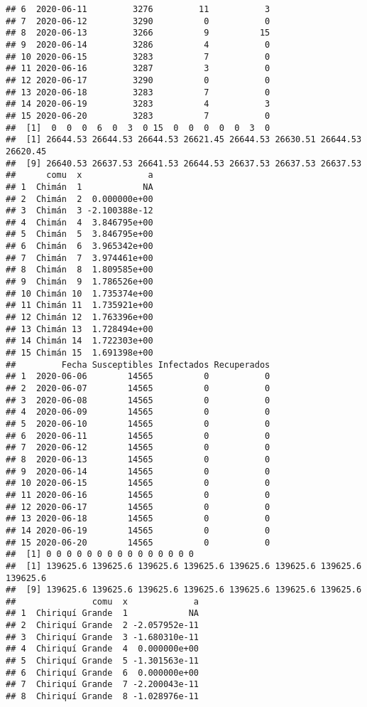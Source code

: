 \documentclass[
]{article}
\begin{document}
\begin{verbatim}
## 6  2020-06-11         3276         11           3
## 7  2020-06-12         3290          0           0
## 8  2020-06-13         3266          9          15
## 9  2020-06-14         3286          4           0
## 10 2020-06-15         3283          7           0
## 11 2020-06-16         3287          3           0
## 12 2020-06-17         3290          0           0
## 13 2020-06-18         3283          7           0
## 14 2020-06-19         3283          4           3
## 15 2020-06-20         3283          7           0
##  [1]  0  0  0  6  0  3  0 15  0  0  0  0  0  3  0
##  [1] 26644.53 26644.53 26644.53 26621.45 26644.53 26630.51 26644.53 26620.45
##  [9] 26640.53 26637.53 26641.53 26644.53 26637.53 26637.53 26637.53
##      comu  x             a
## 1  Chimán  1            NA
## 2  Chimán  2  0.000000e+00
## 3  Chimán  3 -2.100388e-12
## 4  Chimán  4  3.846795e+00
## 5  Chimán  5  3.846795e+00
## 6  Chimán  6  3.965342e+00
## 7  Chimán  7  3.974461e+00
## 8  Chimán  8  1.809585e+00
## 9  Chimán  9  1.786526e+00
## 10 Chimán 10  1.735374e+00
## 11 Chimán 11  1.735921e+00
## 12 Chimán 12  1.763396e+00
## 13 Chimán 13  1.728494e+00
## 14 Chimán 14  1.722303e+00
## 15 Chimán 15  1.691398e+00
##         Fecha Susceptibles Infectados Recuperados
## 1  2020-06-06        14565          0           0
## 2  2020-06-07        14565          0           0
## 3  2020-06-08        14565          0           0
## 4  2020-06-09        14565          0           0
## 5  2020-06-10        14565          0           0
## 6  2020-06-11        14565          0           0
## 7  2020-06-12        14565          0           0
## 8  2020-06-13        14565          0           0
## 9  2020-06-14        14565          0           0
## 10 2020-06-15        14565          0           0
## 11 2020-06-16        14565          0           0
## 12 2020-06-17        14565          0           0
## 13 2020-06-18        14565          0           0
## 14 2020-06-19        14565          0           0
## 15 2020-06-20        14565          0           0
##  [1] 0 0 0 0 0 0 0 0 0 0 0 0 0 0 0
##  [1] 139625.6 139625.6 139625.6 139625.6 139625.6 139625.6 139625.6 139625.6
##  [9] 139625.6 139625.6 139625.6 139625.6 139625.6 139625.6 139625.6
##               comu  x             a
## 1  Chiriquí Grande  1            NA
## 2  Chiriquí Grande  2 -2.057952e-11
## 3  Chiriquí Grande  3 -1.680310e-11
## 4  Chiriquí Grande  4  0.000000e+00
## 5  Chiriquí Grande  5 -1.301563e-11
## 6  Chiriquí Grande  6  0.000000e+00
## 7  Chiriquí Grande  7 -2.200043e-11
## 8  Chiriquí Grande  8 -1.028976e-11

\end{verbatim}
\end{document}
